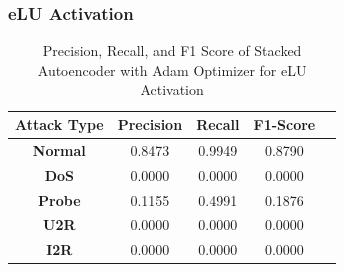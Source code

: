 \documentclass[12pt, a4paper]{report}
\begin{document}
\subsubsection{eLU Activation}
\begin{table}[ht]
\centering
\captionsetup{justification=centering,margin=2cm}
\begin{tabular}{|c|c|c|c|c|}
\hline
\multicolumn{1}{|c|}{\textbf{Attack Type}} & \multicolumn{1}{c|}{\textbf{Precision}} & \multicolumn{1}{c|}{\textbf{Recall}} & \multicolumn{1}{c|}{\textbf{F1-Score}} \\ \hline
\textbf{Normal}        & 0.8473                                   & 0.9949                                & 0.8790                                                                  \\ \hline
\textbf{DoS}           & 0.0000                                  & 0.0000                                &  0.0000                                                                    \\ \hline
\textbf{Probe}         & 0.1155                                  & 0.4991                                & 0.1876                                                                  \\ \hline
\textbf{U2R}           & 0.0000                                    & 0.0000                                & 0.0000                                                                   \\ \hline
\textbf{I2R}           & 0.0000                                      & 0.0000                                   & 0.0000                                                            \\ \hline         \end{tabular}
\caption{Precision, Recall, and F1 Score of Stacked Autoencoder with Adam Optimizer for eLU Activation}
\label{prf1_adam_elu_auto}
\end{table}
\end{document}

